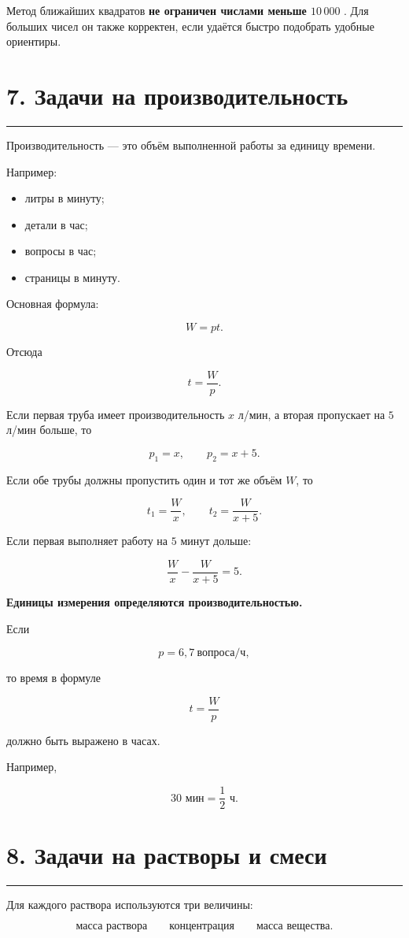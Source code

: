 \documentclass[a4paper,12pt]{article}
\newcommand{\checksection}[1]{%
  \section*{\color{darkaccent}#1}
  \vspace{-0.6em}
  {\color{accent!70}\rule{\linewidth}{0.6pt}}
  \vspace{0.35em}
}
\newcommand{\keyidea}[1]{%
  \textcolor{darkaccent}{\textbf{#1}}
}
\begin{document}
Метод ближайших квадратов \keyidea{не ограничен числами меньше \(10\,000\)}. Для больших чисел он также корректен, если удаётся быстро подобрать удобные ориентиры.


\checksection{7. Задачи на производительность}

Производительность --- это объём выполненной работы за единицу времени.

Например:

\begin{itemize}
  \item литры в минуту;
  \item детали в час;
  \item вопросы в час;
  \item страницы в минуту.
\end{itemize}

Основная формула:

\[
W=pt.
\]

Отсюда

\[
t=\frac{W}{p}.
\]

Если первая труба имеет производительность \(x\) л/мин, а вторая пропускает на \(5\) л/мин больше, то

\[
p_1=x,\qquad p_2=x+5.
\]

Если обе трубы должны пропустить один и тот же объём \(W\), то

\[
t_1=\frac{W}{x},
\qquad
t_2=\frac{W}{x+5}.
\]

Если первая выполняет работу на \(5\) минут дольше:

\[
\frac{W}{x}-\frac{W}{x+5}=5.
\]

\keyidea{Единицы измерения определяются производительностью.}

Если

\[
p=6{,}7\ \text{вопроса/ч},
\]

то время в формуле

\[
t=\frac{W}{p}
\]

должно быть выражено в часах.

Например,

\[
30\text{ мин}=\frac12\text{ ч}.
\]


\checksection{8. Задачи на растворы и смеси}

Для каждого раствора используются три величины:

\[
\boxed{\text{масса раствора}}
\qquad
\boxed{\text{концентрация}}
\qquad
\boxed{\text{масса вещества}}.
\]
\end{document}
